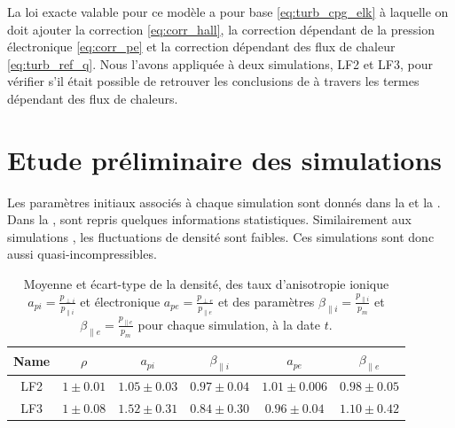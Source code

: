 La loi exacte valable pour ce modèle a pour base \eqref{eq:turb_cpg_elk} à laquelle on doit ajouter la correction  \eqref{eq:corr_hall}, la correction dépendant de la pression électronique \eqref{eq:corr_pe} et la correction dépendant des flux de chaleur \eqref{eq:turb_ref_q}. Nous l'avons appliquée à deux simulations, LF2 et LF3, pour vérifier s'il était possible de retrouver les conclusions de \cite{ferrand_fluid_2021} à travers les termes dépendant des flux de chaleurs. 

\section{Etude préliminaire des simulations}
\label{sec-342}

Les paramètres initiaux associés à chaque simulation sont donnés dans la  et la . Dans la , sont repris quelques informations statistiques. Similairement aux simulations , les fluctuations de densité sont faibles. Ces simulations sont donc aussi quasi-incompressibles. 
 \begin{table}[!ht]
\begin{center}
\begin{tabular}{ c|c|c|c|c|c } 
Name & $\rho$ & $a_{pi}$  & $\beta_{\parallel i }$ & $a_{pe}$  & $\beta_{\parallel e }$\\
\hline
LF2 & $\num{1}\pm \num{0.01}$ & $\num{1.05}\pm \num{0.03}$ & $\num{0.97}\pm \num{0.04}$ & $\num{1.01}\pm \num{0.006}$ & $\num{0.98}\pm \num{0.05}$  \\
LF3 & $\num{1}\pm \num{0.08}$ & $\num{1.52}\pm \num{0.31}$ & $\num{0.84}\pm \num{0.30}$ & $\num{0.96}\pm \num{0.04}$ & $\num{1.10}\pm \num{0.42}$  %
\end{tabular}
\caption{Moyenne et écart-type de la densité, des taux d'anisotropie ionique $a_{pi} = \frac{p_{\perp i}}{p_{\parallel i}}$ et électronique $a_{pe} = \frac{p_{\perp e}}{p_{\parallel e}}$ et des paramètres $\beta_{\parallel i} = \frac{p_{\parallel i}}{p_{m}}$ et $\beta_{\parallel e} = \frac{p_{\parallel e}}{p_{m}}$  pour chaque simulation, à la date $t$. \label{tab:stat_LF}}
\end{center}
\end{table}

